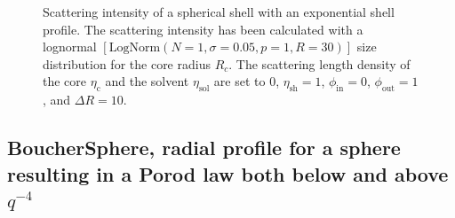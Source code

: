 \begin{figure}[htb]
\begin{center}
\hfill
{}
\end{center}
\caption{Scattering intensity of a spherical shell with an exponential shell profile. The scattering intensity has been calculated
with a lognormal $[\mathrm{LogNorm}(N\!=\!1,\sigma\!=\!0.05,p\!=\!1,R\!=\!30)]$ size distribution for the core radius $R_c$.
The scattering length density of the core $\eta_\text{c}$ and the solvent $\eta_\text{sol}$ are set to 0, $\eta_\text{sh}=1$,
$\phi_\text{in}=0$,  $\phi_\text{out}=1$, and $\Delta R =10$.}
\label{fig:ExpShellExample}
\end{figure}


\clearpage
\subsection{BoucherSphere, radial profile for a sphere resulting in a Porod law both below and above $q^{-4}$}
\label{sect:BoucherSphere} ~\\

